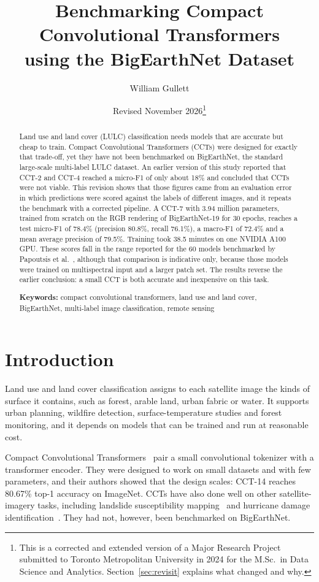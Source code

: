 \documentclass[11pt]{article}
\title{Benchmarking Compact Convolutional Transformers\\using the BigEarthNet Dataset}
\author{William Gullett}
\date{Revised November 2026\thanks{This is a corrected and extended version of a Major Research Project
submitted to Toronto Metropolitan University in 2024 for the M.Sc.\ in Data Science and Analytics.
Section~\ref{sec:revisit} explains what changed and why.}}
\begin{document}
\maketitle

\begin{abstract}
\noindent
Land use and land cover (LULC) classification needs models that are accurate but cheap to train.
Compact Convolutional Transformers (CCTs) were designed for exactly that trade-off, yet they have not been
benchmarked on BigEarthNet, the standard large-scale multi-label LULC dataset. An earlier version of this
study reported that CCT-2 and CCT-4 reached a micro-F1 of only about 18\% and concluded that CCTs were not
viable. This revision shows that those figures came from an evaluation error in which predictions were
scored against the labels of different images, and it repeats the benchmark with a corrected pipeline.
A CCT-7 with 3.94 million parameters, trained from scratch on the RGB rendering of BigEarthNet-19 for
30 epochs, reaches a test micro-F1 of 78.4\% (precision 80.8\%, recall 76.1\%), a macro-F1 of 72.4\% and a
mean average precision of 79.5\%. Training took 38.5 minutes on one NVIDIA A100 GPU. These scores fall in
the range reported for the 60 models benchmarked by Papoutsis et al.~\cite{papoutsis}, although that
comparison is indicative only, because those models were trained on multispectral input and a larger patch
set. The results reverse the earlier conclusion: a small CCT is both accurate and inexpensive on this task.

\medskip
\noindent\textbf{Keywords:} compact convolutional transformers, land use and land cover, BigEarthNet,
multi-label image classification, remote sensing
\end{abstract}

\section{Introduction}

Land use and land cover classification assigns to each satellite image the kinds of surface it contains,
such as forest, arable land, urban fabric or water. It supports urban planning, wildfire detection,
surface-temperature studies and forest monitoring, and it depends on models that can be trained and run
at reasonable cost.

Compact Convolutional Transformers~\cite{hassani} pair a small convolutional tokenizer with a transformer
encoder. They were designed to work on small datasets and with few parameters, and their authors showed
that the design scales: CCT-14 reaches 80.67\% top-1 accuracy on ImageNet. CCTs have also done well on
other satellite-imagery tasks, including landslide susceptibility mapping~\cite{zhao} and hurricane damage
identification~\cite{islam}. They had not, however, been benchmarked on BigEarthNet.
\end{document}
